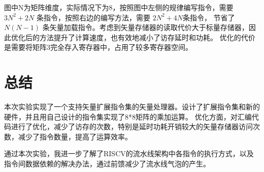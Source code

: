 \documentclass[UTF8]{ctexart}
\begin{document}
图中N为矩阵维度，实际情况下为8，按照图中左侧的规律编写指令，需要 $3N^2+2N$ 条指令，按照右边的编写方法，需要 $2N^2+4N$条指令，
节省了 $N(N-1)$ 条矢量加载指令。考虑到矢量存储器的读取代价大于标量存储器，因此优化后的方法提升了计算速度，也有效地减小了访存延时和功耗。
优化的代价是需要将矩阵3完全存入寄存器中，占用了较多寄存器空间。

\section{总结}
本次实验实现了一个支持矢量扩展指令集的矢量处理器。设计了扩展指令集和新的硬件，并且用自己设计的指令集实现了8*8矩阵的乘加运算。
优化方面，对汇编代码进行了优化，减少了访存的次数，特别是延时功耗开销较大的矢量存储器访问次数，减少了指令数量，提高了运算效率。

通过本次实验，我进一步了解了RISCV的流水线架构中各指令的执行方式，以及指令间数据依赖的解决办法，通过前馈减少了流水线气泡的产生。
\end{document}
